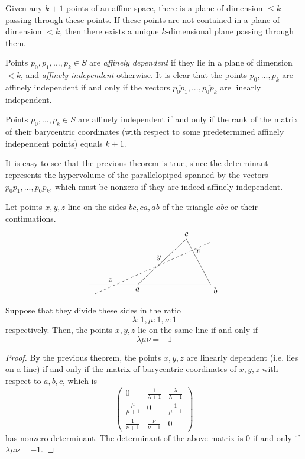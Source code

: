 \documentclass{article}
\begin{document}
    \begin{theorem}
    Given any $k+1$ points of an affine space, there is a plane of dimension $\leq k$ passing through these points. If these points are not contained in a plane of dimension $< k$, then there exists a unique $k$-dimensional plane passing through them. 
    \end{theorem}

    \begin{definition}
    Points $p_0, p_1, ..., p_k \in S$ are \textit{affinely dependent} if they lie in a plane of dimension $<k$, and \textit{affinely independent} otherwise. It is clear that the points $p_0,..., p_k$ are affinely independent if and only if the vectors $\overline{p_0p_1}, ..., \overline{p_0 p_k}$ are linearly independent. 
    \end{definition}

    \begin{theorem}
    Points $p_0, ..., p_k \in S$ are affinely independent if and only if the rank of the matrix of their barycentric coordinates (with respect to some predetermined affinely independent points) equals $k+1$. 
    \end{theorem}

    It is easy to see that the previous theorem is true, since the determinant represents the hypervolume of the parallelopiped spanned by the vectors $\overline{p_0p_1}, ..., \overline{p_0 p_k}$, which must be nonzero if they are indeed affinely independent. 

    \begin{corollary}
    Let points $x, y, z$ line on the sides $bc, ca, ab$ of the triangle $abc$ or their continuations. 
    \[\begin{tikzpicture}[scale=1.3]
        \draw (-1,0)--(3,0)--(2.2, 1.5)--(0.6,0);
        \node[below] at (0.6, 0) {$a$};
        \node[below right] at (3,0) {$b$};
        \node[above] at (2.2, 1.5) {$c$};
        \draw[dashed] (-0.8,-0.3)--(3,1.4);
        \node[above] at (-0.3, 0) {$z$};
        \node[above] at (1.3, 0.7) {$y$};
        \node[right] at (2.4, 1.1) {$x$};
    \end{tikzpicture}\]
    Suppose that they divide these sides in the ratio 
    \[\lambda: 1, \mu: 1, \nu: 1\]
    respectively. Then, the points $x, y, z$ lie on the same line if and only if 
    \[\lambda \mu \nu = -1\]
    \end{corollary}
    \begin{proof}
    By the previous theorem, the points $x, y, z$ are linearly dependent (i.e. lies on a line) if and only if the matrix of barycentric coordinates of $x, y, z$ with respect to $a, b, c$, which is
    \[\begin{pmatrix}
    0 & \frac{1}{\lambda + 1} & \frac{\lambda}{\lambda + 1} \\
    \frac{\mu}{\mu + 1} & 0 & \frac{1}{\mu + 1} \\
    \frac{1}{\nu + 1} & \frac{\nu}{\nu+1} & 0
    \end{pmatrix}\]
    has nonzero determinant. The determinant of the above matrix is $0$ if and only if $\lambda \mu \nu = -1$. 
    \end{proof}
\end{document}
